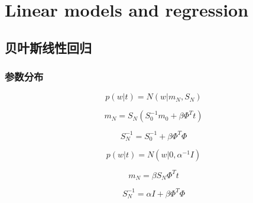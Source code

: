 \chapter{Linear models and regression}
\section{贝叶斯线性回归}
\subsection{参数分布}

\begin{equation}
p(w|t) = N(w|m_N, S_N)
\end{equation}

\begin{equation}
m_N = S_N(S_0^{-1}m_0 + \beta \Phi^Tt)
\end{equation}

\begin{equation}
S_N^{-1} = S_0^{-1} + \beta\Phi^T\Phi
\end{equation}

\begin{equation}
p(w|t) = N(w|0, \alpha^{-1}I)
\end{equation}

\begin{equation}
m_N = \beta S_N\Phi^Tt 
\end{equation}

\begin{equation}
S_N^{-1} = \alpha I + \beta \Phi^T\Phi
\end{equation}
